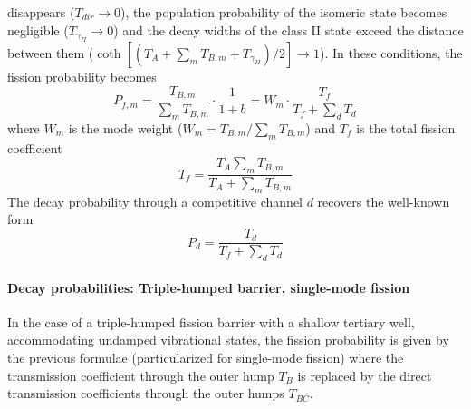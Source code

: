 \documentclass[twocolumn,amsmath,amssymb,10pt,groupedaddress,a4paper]{revtex4}
\begin{document}
disappears ($T_{dir}\rightarrow0$), the population probability of
the isomeric state becomes negligible ($T_{\gamma_{II}}\rightarrow0$)
and the decay widths of the class II state exceed the distance between
them ($\coth[(T_{A}+\sum_{m}T_{B,m}+T_{\gamma_{II}})/2]\rightarrow1$).
In these conditions, the fission probability becomes
\begin{equation}
P_{f,m}=\frac{T_{B,m}}{\sum_{m}T_{B,m}}\cdot\frac{1}{1+b}=W_{m}\cdot\frac{T_{f}}{T_{f}+\sum_{d}T_{d}}
\label{wm}
\end{equation}
\noindent where $W_{m}$ is the mode weight ($W_{m}=T_{B,m}/\sum_{m}T_{B,m}$)
and $T_{f}$ is the total fission coefficient
\begin{equation}
T_{f}=\frac{T_{A}\sum_{m}T_{B,m}}{T_{A}+\sum_{m}T_{B,m}}
\end{equation}
 The decay probability through a competitive channel $d$ recovers
the well-known form
\begin{equation}
P_{d}=\frac{T_{d}}{T_{f}+\sum_{d}T_{d}}
\end{equation}

\paragraph{Decay probabilities: Triple-humped barrier, single-mode fission}
In the case of a triple-humped fission barrier with a shallow tertiary
well, accommodating undamped vibrational states, the fission probability
is given by the previous formulae (particularized for single-mode
fission) where the transmission coefficient through the outer hump
$T_{B}$ is replaced by the direct transmission coefficients through
the outer humps $T_{BC}$.
\end{document}
